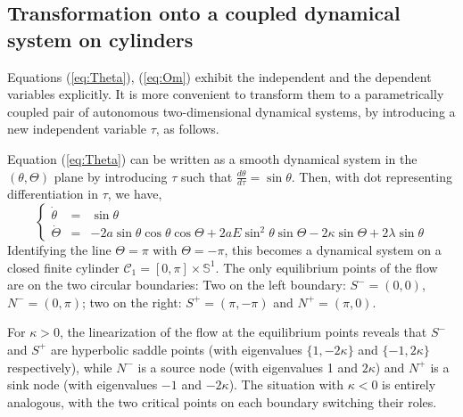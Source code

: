 \documentclass[11 pt]{article}
\renewcommand\({\left(}
\renewcommand\){\right)}
\newcommand\<{\langle}
\renewcommand\>{\rangle}
\newcommand\8{\infty}
\newcommand\beq{\begin{equation}}
\newcommand\eeq{\end{equation}}
\newcommand{\ka} {\kappa}
\newcommand{\la} {\lambda}\newcommand{\La}{\Lambda}
\newcommand{\mc}{\mathcal}
\newcommand{\Sset}{\mathbb{S}}
\begin{document}

\subsection{Transformation onto a coupled dynamical system on cylinders}
 
  Equations (\ref{eq:Theta}), (\ref{eq:Om}) exhibit the independent and the dependent variables explicitly. 
  It is more convenient to transform them to a parametrically coupled pair of autonomous two-dimensional dynamical systems, by introducing a new independent 
variable $\tau$, as follows.
  
 Equation (\ref{eq:Theta}) can be written as a smooth dynamical system in the $(\theta,\Theta)$ plane by introducing 
 $\tau$ such that $\frac{d\theta}{d\tau} = \sin\theta$.
Then, with dot representing differentiation in $\tau$,  we have, 
\beq\label{dynsysTh}
\left\{\begin{array}{rcl}
\dot{\theta} & = & \sin\theta\\
       \dot{\Theta} & = & -2a\sin\theta\cos\theta\cos\Theta+2aE\sin^2\theta\sin\Theta - 2\ka\sin\Theta + 2\la\sin\theta
       \end{array}\right.
\eeq
Identifying the line $\Theta=\pi$ with $\Theta=-\pi$, this becomes a dynamical system on a closed finite cylinder 
$\mc{C}_1=[0,\pi]\times\Sset^1$. 
 The only equilibrium points of the flow are on the two circular boundaries: 
Two on the left boundary: $S^- = (0,0)$, $N^- = (0,\pi)$; two on the right: $S^+ = (\pi,-\pi)$ and $N^+ = (\pi,0)$.  

For $\ka>0$, the linearization of the flow at the equilibrium points reveals that $S^-$ and $S^+$ are hyperbolic saddle points (with 
eigenvalues $\{1,-2\ka\}$ and $\{-1,2\ka\}$ respectively), while $N^-$ is a  source node (with  eigenvalues 1 and $2\ka$) 
and $N^+$ is a sink node (with eigenvalues $-1$ and $-2\ka$).  The situation with $\ka<0$ is entirely analogous, with the two
critical points on each boundary switching their roles.  
\end{document}
